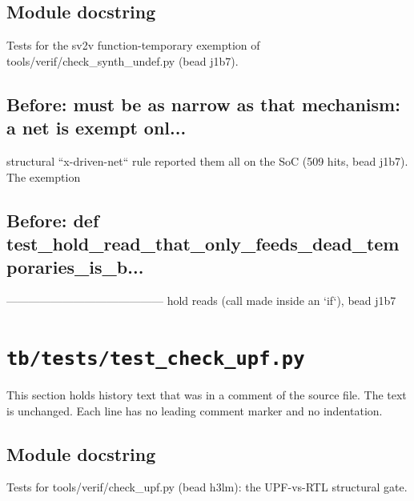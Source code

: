 \begin{record}

\subsection*{Module docstring}

\begin{textblock}
Tests for the sv2v function-temporary exemption of tools/verif/check_synth_undef.py (bead j1b7).
\end{textblock}

\subsection*{Before: must be as narrow as that mechanism: a net is exempt onl...}

\begin{textblock}
structural ``x-driven-net`` rule reported them all on the SoC (509 hits, bead j1b7).  The exemption
\end{textblock}

\subsection*{Before: def test\_hold\_read\_that\_only\_feeds\_dead\_temporaries\_is\_b...}

\begin{textblock}
------------------------------------------ hold reads (call made inside an `if`), bead j1b7
\end{textblock}

\end{record}

\section{\texttt{tb/tests/test\_check\_upf.py}}\label{cr:suite:test-check-upf}

This section holds history text that was in a comment of the source file. The text is unchanged. Each line has no leading comment marker and no indentation.

\begin{record}

\subsection*{Module docstring}

\begin{textblock}
Tests for tools/verif/check_upf.py (bead h3lm): the UPF-vs-RTL structural gate.
\end{textblock}

\end{record}

